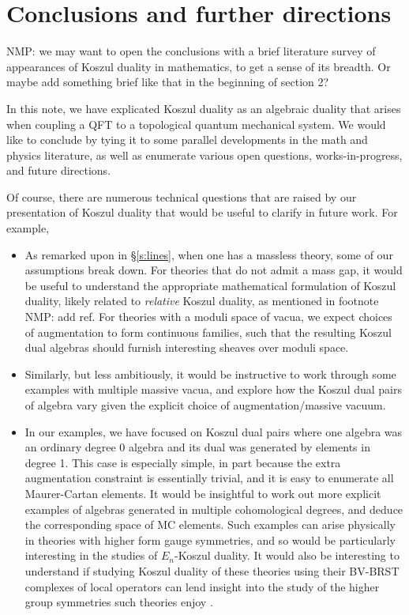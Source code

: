 \documentclass[11pt]{amsart}
\def\natalie#1{{\textcolor{green!65!black}{NMP: {#1}}}}
\begin{document}
\section{Conclusions and further directions}\label{s:conclusions}

\natalie{we may want to open the conclusions with a brief literature survey of appearances of Koszul duality in mathematics, to get a sense of its breadth. Or maybe add something brief like that in the beginning of section 2?}

In this note, we have explicated Koszul duality as an algebraic duality that arises when coupling a QFT to a topological quantum mechanical system. We would like to conclude by tying it to some parallel developments in the math and physics literature, as well as enumerate various open questions, works-in-progress, and future directions.

Of course, there are numerous technical questions that are raised by our presentation of Koszul duality that would be useful to clarify in future work. For example,
\begin{itemize}
\item As remarked upon in \S \ref{s:lines}, when one has a massless theory, some of our assumptions break down. For theories that do not admit a mass gap, it would be useful to understand the appropriate mathematical formulation of Koszul duality, likely related to \textit{relative} Koszul duality, as mentioned in footnote \natalie{add ref}. For theories with a moduli space of vacua, we expect choices of augmentation to form continuous families, such that the resulting Koszul dual algebras should furnish interesting sheaves over moduli space. 

\item Similarly, but less ambitiously, it would be instructive to work through some examples with multiple massive vacua, and explore how the Koszul dual pairs of algebra vary given the explicit choice of augmentation/massive vacuum. 

\item In our examples, we have focused on Koszul dual pairs where one algebra was an ordinary degree 0 algebra and its dual was generated by elements in degree 1. This case is especially simple, in part because the extra augmentation constraint is essentially trivial, and it is easy to enumerate all Maurer-Cartan elements.  It would be insightful to work out more explicit examples of algebras generated in multiple cohomological degrees, and deduce the corresponding space of MC elements. Such examples can arise physically in theories with higher form gauge symmetries, and so would be particularly interesting in the studies of $E_n$-Koszul duality. It would also be interesting to understand if studying Koszul duality of these theories using their BV-BRST complexes of local operators can lend insight into the study of the higher group symmetries such theories enjoy \cite{2group, 2group6}.
\end{itemize}
 
\end{document}
